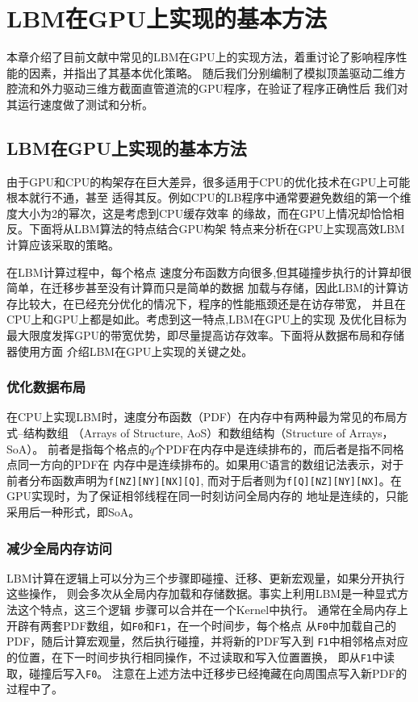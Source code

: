 \chapter{LBM在GPU上实现的基本方法}
本章介绍了目前文献中常见的LBM在GPU上的实现方法，着重讨论了影响程序性能的因素，并指出了其基本优化策略。
随后我们分别编制了模拟顶盖驱动二维方腔流和外力驱动三维方截面直管道流的GPU程序，在验证了程序正确性后
我们对其运行速度做了测试和分析。

\section{LBM在GPU上实现的基本方法}\label{optimize}
由于GPU和CPU的构架存在巨大差异，很多适用于CPU的优化技术在GPU上可能根本就行不通，甚至
适得其反。例如CPU的LB程序中通常要避免数组的第一个维度大小为2的幂次，这是考虑到CPU缓存效率
的缘故，而在GPU上情况却恰恰相反。下面将从LBM算法的特点结合GPU构架
特点来分析在GPU上实现高效LBM计算应该采取的策略。

在LBM计算过程中，每个格点
速度分布函数方向很多,但其碰撞步执行的计算却很简单，在迁移步甚至没有计算而只是简单的数据
加载与存储，因此LBM的计算访存比较大，在已经充分优化的情况下，程序的性能瓶颈还是在访存带宽，
并且在CPU上和GPU上都是如此。考虑到这一特点,LBM在GPU上的实现
及优化目标为最大限度发挥GPU的带宽优势，即尽量提高访存效率。下面将从数据布局和存储器使用方面
介绍LBM在GPU上实现的关键之处。

\subsection{优化数据布局}
在CPU上实现LBM时，速度分布函数（PDF）在内存中有两种最为常见的布局方式\---结构数组
（Arrays of Structure, AoS）和数组结构（Structure of Arrays，SoA）。
前者是指每个格点的$q$个PDF在内存中是连续排布的，而后者是指不同格点同一方向的PDF在
内存中是连续排布的。如果用C语言的数组记法表示，对于前者分布函数声明为\verb+f[NZ][NY][NX][Q]+,
而对于后者则为\verb+f[Q][NZ][NY][NX]+。在GPU实现时，为了保证相邻线程在同一时刻访问全局内存的
地址是连续的，只能采用后一种形式，即SoA。

\subsection{减少全局内存访问}
LBM计算在逻辑上可以分为三个步骤即碰撞、迁移、更新宏观量，如果分开执行这些操作，
则会多次从全局内存加载和存储数据。事实上利用LBM是一种显式方法这个特点，这三个逻辑
步骤可以合并在一个Kernel中执行。
通常在全局内存上开辟有两套PDF数组，如\verb+F0+和\verb+F1+，在一个时间步，每个格点
从\verb+F0+中加载自己的PDF，随后计算宏观量，然后执行碰撞，并将新的PDF写入到
\verb+F1+中相邻格点对应的位置，在下一时间步执行相同操作，不过读取和写入位置置换，
即从\verb+F1+中读取，碰撞后写入\verb+F0+。
注意在上述方法中迁移步已经掩藏在向周围点写入新PDF的过程中了。

